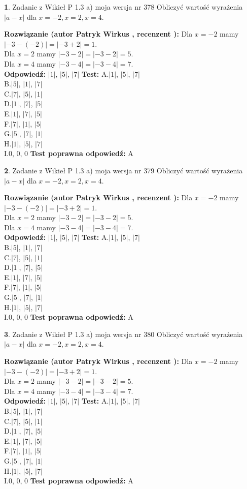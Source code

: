 \documentclass[12pt, a4paper]{article}
\theoremstyle{definition} %
\newtheorem{zad}{}
\newcommand{\zadStart}[1]{\begin{zad}#1\newline}
\newcommand{\zadStop}{\end{zad}}
\newcommand{\rozwStart}[2]{\noindent \textbf{Rozwiązanie (autor #1 , recenzent #2): }\newline}
\newcommand{\rozwStop}{\newline}
\newcommand{\odpStart}{\noindent \textbf{Odpowiedź:}\newline}
\newcommand{\odpStop}{\newline}
\newcommand{\testStart}{\noindent \textbf{Test:}\newline}
\newcommand{\testStop}{\newline}
\newcommand{\kluczStart}{\noindent \textbf{Test poprawna odpowiedź:}\newline}
\newcommand{\kluczStop}{\newline}
\begin{document}
\zadStart{Zadanie z Wikieł P 1.3 a) moja wersja nr 378}
Obliczyć wartość wyrażenia $|a - x|$ dla $x=-2,x=2,x=4$.
\zadStop
\rozwStart{Patryk Wirkus}{}
Dla $x = -2$ mamy $|-3 - (-2)| = |-3 + 2| = 1$.\\
Dla $x = 2$ mamy $|-3 - 2| = |-3 - 2| = 5$.\\
Dla $x = 4$ mamy $|-3 - 4| = |-3 - 4| = 7$.\\
\rozwStop
\odpStart
$|1|$, $|5|$, $|7|$
\odpStop
\testStart
A.$|1|$, $|5|$, $|7|$\\
B.$|5|$, $|1|$, $|7|$\\
C.$|7|$, $|5|$, $|1|$\\
D.$|1|$, $|7|$, $|5|$\\
E.$|1|$, $|7|$, $|5|$\\
F.$|7|$, $|1|$, $|5|$\\
G.$|5|$, $|7|$, $|1|$\\
H.$|1|$, $|5|$, $|7|$\\
I.$0$, $0$, $0$
\testStop
\kluczStart
A
\kluczStop



\zadStart{Zadanie z Wikieł P 1.3 a) moja wersja nr 379}
Obliczyć wartość wyrażenia $|a - x|$ dla $x=-2,x=2,x=4$.
\zadStop
\rozwStart{Patryk Wirkus}{}
Dla $x = -2$ mamy $|-3 - (-2)| = |-3 + 2| = 1$.\\
Dla $x = 2$ mamy $|-3 - 2| = |-3 - 2| = 5$.\\
Dla $x = 4$ mamy $|-3 - 4| = |-3 - 4| = 7$.\\
\rozwStop
\odpStart
$|1|$, $|5|$, $|7|$
\odpStop
\testStart
A.$|1|$, $|5|$, $|7|$\\
B.$|5|$, $|1|$, $|7|$\\
C.$|7|$, $|5|$, $|1|$\\
D.$|1|$, $|7|$, $|5|$\\
E.$|1|$, $|7|$, $|5|$\\
F.$|7|$, $|1|$, $|5|$\\
G.$|5|$, $|7|$, $|1|$\\
H.$|1|$, $|5|$, $|7|$\\
I.$0$, $0$, $0$
\testStop
\kluczStart
A
\kluczStop



\zadStart{Zadanie z Wikieł P 1.3 a) moja wersja nr 380}
Obliczyć wartość wyrażenia $|a - x|$ dla $x=-2,x=2,x=4$.
\zadStop
\rozwStart{Patryk Wirkus}{}
Dla $x = -2$ mamy $|-3 - (-2)| = |-3 + 2| = 1$.\\
Dla $x = 2$ mamy $|-3 - 2| = |-3 - 2| = 5$.\\
Dla $x = 4$ mamy $|-3 - 4| = |-3 - 4| = 7$.\\
\rozwStop
\odpStart
$|1|$, $|5|$, $|7|$
\odpStop
\testStart
A.$|1|$, $|5|$, $|7|$\\
B.$|5|$, $|1|$, $|7|$\\
C.$|7|$, $|5|$, $|1|$\\
D.$|1|$, $|7|$, $|5|$\\
E.$|1|$, $|7|$, $|5|$\\
F.$|7|$, $|1|$, $|5|$\\
G.$|5|$, $|7|$, $|1|$\\
H.$|1|$, $|5|$, $|7|$\\
I.$0$, $0$, $0$
\testStop
\kluczStart
A
\kluczStop
\end{document}
